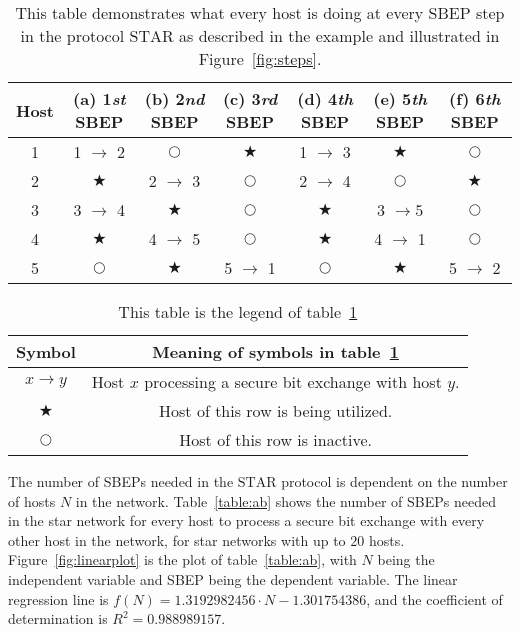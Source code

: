 \documentclass[a4paper,12pt,pdftex]{article}
\begin{document}
\begin{table}[H]
  \begin{center}
    \begin{tabular}{| c | c | c | c | c | c | c |}
    \hline
    Host & (a) 1\textit{st} SBEP & (b) 2\textit{nd} SBEP & (c) 3\textit{rd} SBEP & (d) 4\textit{th} SBEP & (e) 5\textit{th} SBEP & (f) 6\textit{th} SBEP \\
    \hline
     1 & 1 $\rightarrow$ 2 & $\bigcirc$ & $\bigstar$ & 1 $\rightarrow$ 3 & $\bigstar$ & $\bigcirc$ \\
     \hline
     2 & $\bigstar$ & 2 $\rightarrow$ 3 & $\bigcirc$ & 2 $\rightarrow$ 4 & $\bigcirc$ & $\bigstar$ \\
     \hline
     3 & 3 $\rightarrow$ 4 & $\bigstar$ & $\bigcirc$ & $\bigstar$ & 3 $\rightarrow 5$ & $\bigcirc$ \\
     \hline
     4 & $\bigstar$ & 4 $\rightarrow$ 5 & $\bigcirc$ & $\bigstar$ & 4 $\rightarrow$ 1 & $\bigcirc$ \\
     \hline
     5 & $\bigcirc$ & $\bigstar$ & 5 $\rightarrow$ 1 & $\bigcirc$ & $\bigstar$ & 5 $\rightarrow$ 2 \\
    \hline
    \end{tabular}
  \end{center}
  \caption{This table demonstrates what every host is doing at every SBEP step in the protocol $\mathrm{STAR}$ as described in the example and illustrated in Figure~\ref{fig:steps}.}
  \label{table:steps}
\end{table}

\begin{table}[H]
  \begin{center}
    \begin{tabular}{| c | c |}
    \hline
    Symbol & Meaning of symbols in table~\ref{table:steps}\\
    \hline
    $x \rightarrow y$ & Host $x$ processing a secure bit exchange with host $y$. \\
    \hline
    $\bigstar$ & Host of this row is being utilized. \\
    \hline
    $\bigcirc$ & Host of this row is inactive. \\    
    \hline
    \end{tabular}
  \end{center}
  \caption{This table is the legend of table~\ref{table:steps}}
  \label{table:legend}
\end{table}

The number of SBEPs needed in the $\mathrm{STAR}$ protocol is dependent on the number of hosts $N$ in the network. Table~\ref{table:ab} shows the number of SBEPs needed in the star network for every host to process a secure bit exchange with every other host in the network, for star networks with up to $20$ hosts. Figure~\ref{fig:linearplot} is the plot of table~\ref{table:ab}, with $N$ being the independent variable and SBEP being the dependent variable. The linear regression line is $f(N)=1.3192982456 \cdot N - 1.301754386$, and the coefficient of determination is $R^{2} = 0.988989157$.
\end{document}
